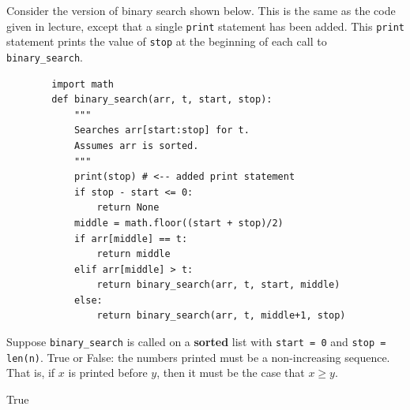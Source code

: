 \begin{prob}
    Consider the version of binary search shown below. This is the same as
    the code given in lecture, except that a single \texttt{print} statement
    has been added. This \texttt{print} statement prints the value of
    \texttt{stop} at the beginning of each call to \texttt{binary_search}.

    \begin{verbatim}
        import math
        def binary_search(arr, t, start, stop):
            """
            Searches arr[start:stop] for t.
            Assumes arr is sorted.
            """
            print(stop) # <-- added print statement
            if stop - start <= 0:
                return None
            middle = math.floor((start + stop)/2)
            if arr[middle] == t:
                return middle
            elif arr[middle] > t:
                return binary_search(arr, t, start, middle)
            else:
                return binary_search(arr, t, middle+1, stop)
    \end{verbatim}

    Suppose \texttt{binary_search} is called on a \textbf{sorted} list with
    \texttt{start = 0} and \texttt{stop = len(n)}. True or False: the numbers
    printed must be a non-increasing sequence. That is, if $x$ is printed
    before $y$, then it must be the case that $x \geq y$.

    \Tf{}
    
    \begin{soln}
        True
    \end{soln}

\end{prob}
